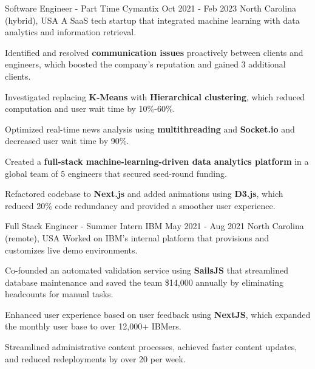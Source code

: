 \begin{cventries}
    \cventry
    {Software Engineer - Part Time} %
    {Cymantix} %
    {Oct 2021 - Feb 2023} %
    {North Carolina (hybrid), USA} %
    {A SaaS tech startup that integrated machine learning with data analytics and information retrieval.}
    {
      \begin{cvitems} %
        \item {Identified and resolved \textbf{communication issues} proactively between clients and engineers, which boosted the company's reputation and gained 3 additional clients.}
        \item {Investigated replacing \textbf{K-Means} with \textbf{Hierarchical clustering}, which reduced computation and user wait time by 10\%-60\%.}
        \item {Optimized real-time news analysis using \textbf{multithreading} and \textbf{Socket.io} and decreased user wait time by 90\%.}
        \item {Created a \textbf{full-stack machine-learning-driven data analytics platform} in a global team of 5 engineers that secured seed-round funding.}
        \item {Refactored codebase to \textbf{Next.js} and added animations using \textbf{D3.js}, which reduced 20\% code redundancy and provided a smoother user experience.}
      \end{cvitems}
    }

    \cventry
    {Full Stack Engineer - Summer Intern} %
    {IBM} %
    {May 2021 - Aug 2021} %
    {North Carolina (remote), USA} %
    {Worked on IBM's internal platform that provisions and customizes live demo environments.}
    {
      \begin{cvitems} %
        \item {Co-founded an automated validation service using \textbf{SailsJS} that streamlined database maintenance and saved the team \$14,000 annually by eliminating headcounts for manual tasks.}
        \item {Enhanced user experience based on user feedback using \textbf{NextJS}, which expanded the monthly user base to over 12,000+ IBMers.}
        \item {Streamlined administrative content processes, achieved faster content updates, and reduced redeployments by over 20 per week.}
      \end{cvitems}
    }


\end{cventries}
